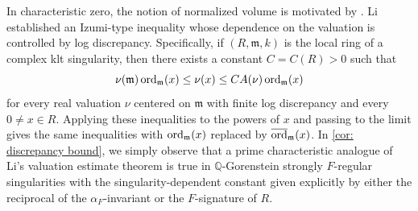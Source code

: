 \documentclass[12pt]{amsart}
\numberwithin{equation}{theorem}
\theoremstyle{plain}
\newcommand{\fm}{\mathfrak{m}}
\newcommand{\QQ}{\mathbb{Q}}
\newcommand{\NN}{\mathbb{N}}
\newcommand{\fa}{\mathfrak{a}}
\DeclareMathOperator{\FPT}{fpt}
\begin{document}

In characteristic zero, the notion of normalized volume is motivated by \cite[Theorem~1.2]{Li18}. Li established an Izumi-type inequality whose dependence on the valuation is controlled by log discrepancy. Specifically, if $(R,\fm,k
)$ is the local ring of a complex klt singularity, then there exists a constant $C=C(R)>0$ such that
\[
    \nu(\fm)\ord_{\fm}(x)
    \leq \nu(x)
    \leq C A(\nu)\ord_{\fm}(x)
\]
for every real valuation $\nu$ centered on $\fm$ with finite log discrepancy and every $0\not=x\in R$. Applying these inequalities to the powers of $x$ and passing to the limit gives the same inequalities with $\ord_{\fm}(x)$ replaced by $\overline{\ord}_{\fm}(x)$. In \cref{cor: discrepancy bound}, we simply observe that a prime characteristic analogue of Li's valuation estimate theorem is true in $\QQ$-Gorenstein strongly $F$-regular singularities with the singularity-dependent constant given explicitly by either the reciprocal of the $\alpha_F$-invariant or the $F$-signature of $R$.
\end{document}
